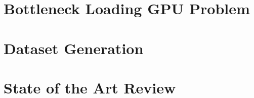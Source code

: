 \documentclass{article}
\begin{document}
\newpage
    
\newpage

\newpage
    \tableofcontents
\newpage





\section{Bottleneck Loading GPU Problem}
\section{Dataset Generation}
\section{State of the Art Review}



\end{document}
